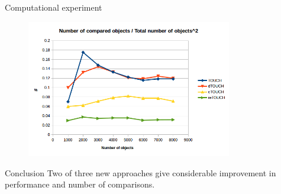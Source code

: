 \documentclass{beamer}
\begin{document}
\begin{frame}{Computational experiment}
\begin{figure}[p]
    \centering
    \includegraphics[width=0.8\textwidth]{Images/compObj.png}
\end{figure}
\end{frame}
\begin{frame}{Conclusion}
Two of three new approaches give considerable improvement in performance and number of comparisons.
\end{frame}
\end{document}
